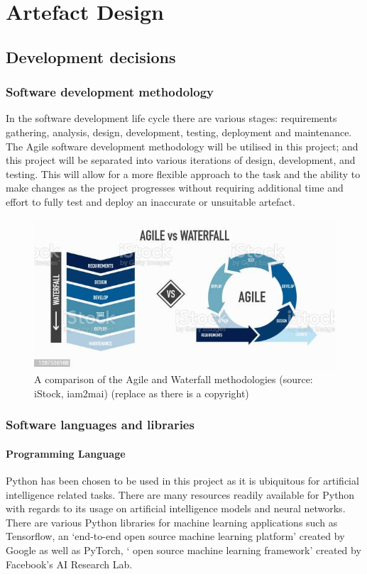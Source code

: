\chapter{Artefact Design} \label{chap:artefact-design}
\section{Development decisions}
\subsection{Software development methodology}
In the software development life cycle there are various stages: requirements gathering, analysis, design,
development, testing, deployment and maintenance.\\
The Agile software development methodology will be utilised in this project; and this project will be separated
into various iterations of design, development, and testing. This will allow for a more flexible approach to
the task and the ability to make changes as the project progresses without requiring additional time and effort
to fully test and deploy an inaccurate or unsuitable artefact.
\begin{figure}
    \centering
    \includegraphics[width=\columnwidth]{figures/development_methodologies.jpg}
    \caption{A comparison of the Agile and Waterfall methodologies (source: iStock, iam2mai)
    (replace as there is a copyright)}
    \label{fig:development_methodologies}
\end{figure}
\FloatBarrier

\subsection{Software languages and libraries}
\subsubsection{Programming Language}
Python has been chosen to be used in this project as it is ubiquitous for artificial intelligence related
tasks. There are many resources readily available for Python with regards to its usage on artificial
intelligence models and neural networks. There are various Python libraries for machine learning applications
such as Tensorflow, an `end-to-end open source machine learning platform' created by Google as well as
PyTorch, ` open source machine learning framework' created by Facebook's AI Research Lab.

